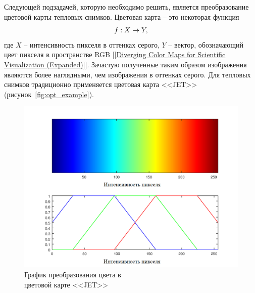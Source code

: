 \documentclass[14pt, a4paper]{extreport}
\begin{document}
	Следующей подзадачей, которую необходимо решить, является преобразование цветовой карты тепловых снимков. Цветовая карта -- это некоторая функция
	\vspace*{-0.4cm}
	\begin{equation}
		f: X \rightarrow Y,
		\label{eq:fXY}
		\vspace*{-0.4cm}	
	\end{equation}
	 где $X$ -- интенсивность пикселя в оттенках серого, $Y$ -- вектор, обозначающий цвет пикселя в пространстве RGB [\ref{Diverging Color Maps for Scientific Visualization (Expanded)}]. Зачастую полученные таким образом изображения являются более наглядными, чем изображения в оттенках серого. Для тепловых снимков традиционно применяется цветовая карта <<JET>> (рисунок~\ref{fig:opt_example}). 
	
	\begin{figure}[ht!]
		\centering
		\includegraphics[width = 13cm]{image/chapter_2/jet}	
		\caption{График преобразования цвета в\\цветовой карте <<JET>>}
		\label{fig:jet}
	\end{figure}
	
\end{document}
